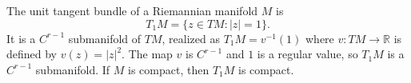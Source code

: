 The unit tangent bundle of a Riemannian manifold $M$ is
$$T_1 M = \{z \in TM : |z| = 1\}.$$
It is a $C^{r-1}$ submanifold of $TM$, realized as $T_1 M = v^{-1}(1)$ where $v: TM \to \mathbb{R}$ is defined by $v(z) = |z|^2$. The map $v$ is $C^{r-1}$ and $1$ is a regular value, so $T_1 M$ is a $C^{r-1}$ submanifold. If $M$ is compact, then $T_1 M$ is compact.
